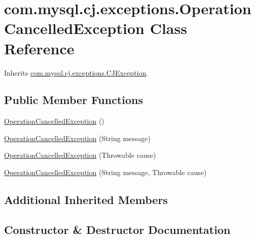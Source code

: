 \hypertarget{classcom_1_1mysql_1_1cj_1_1exceptions_1_1_operation_cancelled_exception}{}\section{com.\+mysql.\+cj.\+exceptions.\+Operation\+Cancelled\+Exception Class Reference}
\label{classcom_1_1mysql_1_1cj_1_1exceptions_1_1_operation_cancelled_exception}


Inherits \mbox{\hyperlink{classcom_1_1mysql_1_1cj_1_1exceptions_1_1_c_j_exception}{com.\+mysql.\+cj.\+exceptions.\+C\+J\+Exception}}.

\subsection*{Public Member Functions}
\begin{DoxyCompactItemize}
\item 
\mbox{\hyperlink{classcom_1_1mysql_1_1cj_1_1exceptions_1_1_operation_cancelled_exception_a941f793d62314aa0383c3b9c7bbd3978}{Operation\+Cancelled\+Exception}} ()
\item 
\mbox{\hyperlink{classcom_1_1mysql_1_1cj_1_1exceptions_1_1_operation_cancelled_exception_a238f1d33cf129cf47a623bc472ea03cd}{Operation\+Cancelled\+Exception}} (String message)
\item 
\mbox{\hyperlink{classcom_1_1mysql_1_1cj_1_1exceptions_1_1_operation_cancelled_exception_a24ff42dc168e6f3f3852458e03febab7}{Operation\+Cancelled\+Exception}} (Throwable cause)
\item 
\mbox{\hyperlink{classcom_1_1mysql_1_1cj_1_1exceptions_1_1_operation_cancelled_exception_ad03b2b5c0bbee8a9cd0f3f50bd317eb3}{Operation\+Cancelled\+Exception}} (String message, Throwable cause)
\end{DoxyCompactItemize}
\subsection*{Additional Inherited Members}


\subsection{Constructor \& Destructor Documentation}
\mbox{\label{classcom_1_1mysql_1_1cj_1_1exceptions_1_1_operation_cancelled_exception_a941f793d62314aa0383c3b9c7bbd3978}} 
